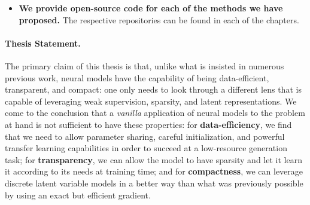 \begin{itemize}
      \item \textbf{We provide open-source code for each of the
                  methods we have proposed.}
            The respective repositories can be found in each
            of the chapters.


\end{itemize}

\paragraph{Thesis Statement.} The primary claim of this thesis is
that, unlike what is insisted in numerous previous work, neural
models have the capability of being data-efficient, transparent, and
compact: one only needs to look through a different lens that is
capable of leveraging weak supervision, sparsity, and latent
representations. We come to the conclusion that a \textit{vanilla}
application of neural models to the problem at hand is not sufficient
to have these properties: for \textbf{data-efficiency}, we find that we need
to allow parameter sharing, careful initialization, and powerful
transfer learning capabilities in order to succeed at a low-resource
generation task; for \textbf{transparency}, we can allow the model to have
sparsity and let it learn it according to its needs at training time; and
for \textbf{compactness}, we can leverage discrete latent variable models in a
better way than what was previously possible by using an exact but
efficient gradient.
